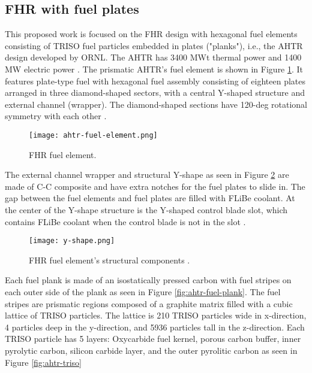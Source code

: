 \subsection{FHR with fuel plates} %

This proposed work is focused on the FHR design with hexagonal fuel elements 
consisting of \gls{TRISO} fuel particles embedded in plates ("planks"), i.e., the 
\gls{AHTR} design developed by ORNL. 
The \gls{AHTR} has 3400 MWt thermal power and 1400 MW electric power 
\cite{varma_ahtr_2012}. 
The prismatic \gls{AHTR}'s fuel element is shown in Figure \ref{fig:ahtr-fuel-element}.  
It features plate-type fuel with hexagonal fuel assembly consisting of eighteen plates 
arranged in three diamond-shaped sectors, with a central Y-shaped structure 
and external channel (wrapper).
The diamond-shaped sections have 120-deg rotational symmetry with each other 
\cite{varma_ahtr_2012,ramey_monte_2018,noauthor_fluoride_nodate}. 

\begin{figure}[]
    \centering
    \texttt{[image: ahtr-fuel-element.png]} 
    \caption{FHR fuel element.}
    \label{fig:ahtr-fuel-element}
\end{figure}

The external channel wrapper and structural Y-shape as seen in Figure 
\ref{fig:y-shape} are made of C-C composite and have extra notches for the 
fuel plates to slide in. 
The gap between the fuel elements and fuel plates are filled with \gls{FLiBe}
coolant. 
At the center of the Y-shape structure is the Y-shaped control blade slot, 
which contains \gls{FLiBe} coolant when the control blade is not in the slot
\cite{varma_ahtr_2012,ramey_monte_2018,noauthor_fluoride_nodate}.

\begin{figure}[]
    \centering
    \texttt{[image: y-shape.png]} 
    \caption{FHR fuel element's structural components \cite{noauthor_fluoride_nodate}.}
    \label{fig:y-shape}
\end{figure}

Each fuel plank is made of an isostatically pressed carbon with fuel stripes 
on each outer side of the plank as seen in Figure \ref{fig:ahtr-fuel-plank}. 
The fuel stripes are prismatic regions composed of a graphite matrix filled with 
a cubic lattice of \gls{TRISO} particles. 
The lattice is 210 \gls{TRISO} particles wide in x-direction, 4 particles deep in 
the y-direction, and 5936 particles tall in the z-direction. 
Each \gls{TRISO} particle has 5 layers: Oxycarbide fuel kernel, porous carbon 
buffer, inner pyrolytic carbon, silicon carbide layer, and the outer pyrolitic 
carbon as seen in Figure \ref{fig:ahtr-triso}

